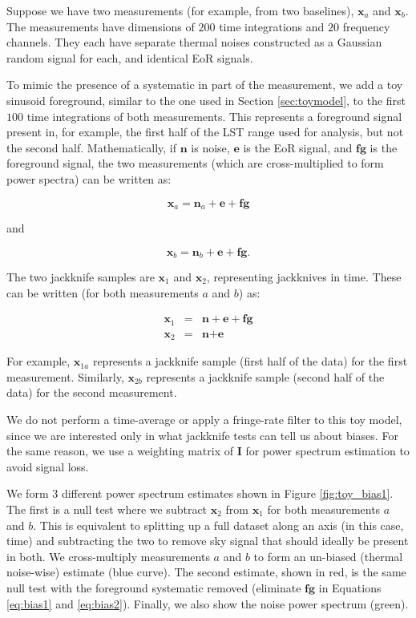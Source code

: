 \documentclass[preprint2,numberedappendix,tighten]{aastex6}  %
\begin{document}
Suppose we have two measurements (for example, from two baselines), $\textbf{x}_{a}$ and $\textbf{x}_{b}$. The measurements have dimensions of $200$ time integrations and $20$ frequency channels. They each have separate thermal noises constructed as a Gaussian random signal for each, and identical EoR signals. 

To mimic the presence of a systematic in part of the measurement, we add a toy sinusoid foreground, similar to the one used in Section \ref{sec:toymodel}, to the first $100$ time integrations of both measurements. This represents a foreground signal present in, for example, the first half of the LST range used for analysis, but not the second half. Mathematically, if  $\textbf{n}$ is noise, $\textbf{e}$ is the EoR signal, and $\textbf{fg}$ is the foreground signal, the two measurements (which are cross-multiplied to form power spectra) can be written as:

\begin{equation}
\label{eq:bias1}
\textbf{x}_{a} = \textbf{n}_{a} + \textbf{e} + \textbf{fg}
\end{equation} 

\noindent and 

\begin{equation}
\label{eq:bias2}
\textbf{x}_{b} = \textbf{n}_{b} + \textbf{e} + \textbf{fg}.
\end{equation}

\noindent The two jackknife samples are $\textbf{x}_{1}$ and $\textbf{x}_{2}$, representing jackknives in time. These can be written (for both measurements $a$ and $b$) as:

\begin{eqnarray}
\textbf{x}_{1} &=& \textbf{n} + \textbf{e} + \textbf{fg} \\
\textbf{x}_{2} &=& \textbf{n} + \textbf{e} 
\end{eqnarray}

\noindent For example, $\textbf{x}_{1a}$ represents a jackknife sample (first half of the data) for the first measurement. Similarly, $\textbf{x}_{2b}$ represents a jackknife sample (second half of the data) for the second measurement.

We do not perform a time-average or apply a fringe-rate filter to this toy model, since we are interested only in what jackknife tests can tell us about biases. For the same reason, we use a weighting matrix of $\textbf{I}$ for power spectrum estimation to avoid signal loss. 

We form $3$ different power spectrum estimates shown in Figure \ref{fig:toy_bias1}. The first is a null test where we subtract $\textbf{x}_{2}$ from $\textbf{x}_{1}$ for both measurements $a$ and $b$. This is equivalent to splitting up a full dataset along an axis (in this case, time) and subtracting the two to remove sky signal that should ideally be present in both. We cross-multiply measurements $a$ and $b$ to form an un-biased (thermal noise-wise) estimate (blue curve). The second estimate, shown in red, is the same null test with the foreground systematic removed (eliminate $\textbf{fg}$ in Equations \ref{eq:bias1} and \ref{eq:bias2}). Finally, we also show the noise power spectrum (green).
\end{document}
